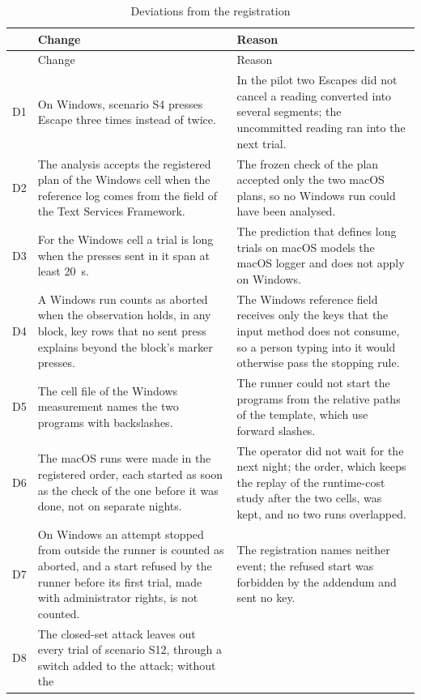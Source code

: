 {\tablebodyfont
\begin{longtable}{L{0.08}L{0.46}L{0.46}}
\caption{Deviations from the registration}
\label{tab:deviations}\\
\toprule
& Change & Reason \\
\midrule
\endfirsthead
{}
\toprule
& Change & Reason \\
\midrule
\endhead
D1 & On Windows, scenario S4 presses Escape three times instead of twice. &
In the pilot two Escapes did not cancel a reading converted into several segments; the uncommitted reading ran into
the next trial. \\
D2 & The analysis accepts the registered plan of the Windows cell when the reference log comes from the field of the
Text Services Framework. &
The frozen check of the plan accepted only the two macOS plans, so no Windows run could have been analysed. \\
D3 & For the Windows cell a trial is long when the presses sent in it span at least 20~s. &
The prediction that defines long trials on macOS models the macOS logger and does not apply on Windows. \\
D4 & A Windows run counts as aborted when the observation holds, in any block, key rows that no sent press explains
beyond the block's marker presses. &
The Windows reference field receives only the keys that the input method does not consume, so a person typing into it
would otherwise pass the stopping rule. \\
D5 & The cell file of the Windows measurement names the two programs with backslashes. &
The runner could not start the programs from the relative paths of the template, which use forward slashes. \\
D6 & The macOS runs were made in the registered order, each started as soon as the check of the one before it was
done, not on separate nights. &
The operator did not wait for the next night; the order, which keeps the replay of the runtime-cost study after the
two cells, was kept, and no two runs overlapped. \\
D7 & On Windows an attempt stopped from outside the runner is counted as aborted, and a start refused by the runner
before its first trial, made with administrator rights, is not counted. &
The registration names neither event; the refused start was forbidden by the addendum and sent no key. \\
D8 & The closed-set attack leaves out every trial of scenario S12, through a switch added to the attack; without the

\end{longtable}}
